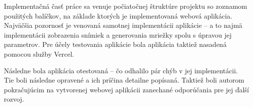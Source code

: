 Implementačná časť práce sa venuje počiatočnej štruktúre projektu so zoznamom použitých balíčkov, na základe ktorých je implementovaná webová aplikácia. Najväčšia pozornosť je venovaná samotnej implementácii aplikácie -- a to najmä implementácii zobrazenia snímiek a generovania mriežky spolu s úpravou jej parametrov. Pre účely testovania aplikácie bola aplikácia taktiež nasadená pomocou služby Vercel.

Následne bola aplikácia otestovaná -- čo odhalilo pár chýb v jej implementácii. Tie boli následne opravené a ich príčina detailne popísaná. Taktiež boli autorom pokračujúcim na vytvorenej webovej aplikácii zanechané odporúčania pre jej ďalší rozvoj.

